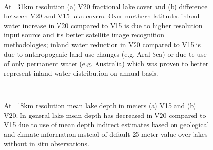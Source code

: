 \documentclass[hess, twostagejnl]{copernicus}
\begin{document}
\begin{figure}
	 \\
	\caption{At ~31km resolution (a) V20 fractional lake cover and (b) difference between V20 and V15 lake covers. Over northern latitudes inland water increase in V20 compared to V15 is due to higher resolution input source and its better satellite image recognition methodologies; inland water reduction in V20 compared to V15 is due to anthropogenic land use changes (e.g. Aral Sea) or due to use of only permanent water (e.g. Australia) which was proven to better represent inland water distribution on annual basis.} 
	\label{fig:example_figure_a}
\end{figure}



\begin{figure}
	 \\
	\caption{At ~18km resolution mean lake depth in meters (a) V15 and (b) V20. In general lake mean depth has decreased in V20 compared to V15 due to use of mean depth indirect estimates based on geological and climate information instead of default 25 meter value over lakes without in situ observations.} 
	\label{fig:example_figure_b}
	\end{figure}
\end{document}
